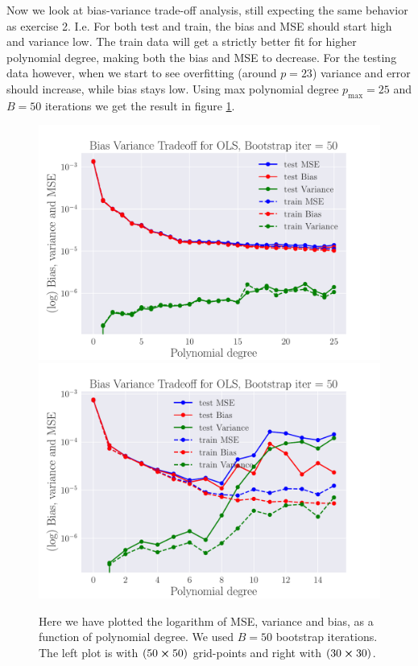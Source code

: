 \documentclass[reprint,english,notitlepage,aps,nobalancelastpage,nofootinbib]{revtex4-1}  %
\begin{document}
Now we look at bias-variance trade-off analysis, still expecting the same behavior as exercise 2. I.e. For both test and train, the bias and MSE should start high and variance low. The train data will get a strictly better fit for higher polynomial degree, making both the bias and MSE to decrease. For the testing data however, when we start to see overfitting (around $p=23$) variance and error should increase, while bias stays low. Using max polynomial degree $p_\text{max}=25$ and $B=50$ iterations we get the result in figure \ref{fig:terrain_OLS_BVT}.

\begin{figure}[H]
	\includegraphics[width=\linewidth]{SRTM_BVT_OLS_n50_log.pdf}
	\endminipage\hfill
	\includegraphics[width=\linewidth]{SRTM_BVT_OLS_n30_log.pdf}
	\endminipage
	\caption{Here we have plotted the logarithm of MSE, variance and bias, as a function of polynomial degree. We used $B=50$ bootstrap iterations. The left plot is with $(50\cross50)$ grid-points and right with $(30\cross30)$.}
  \label{fig:terrain_OLS_BVT}
\end{figure}
\end{document}
